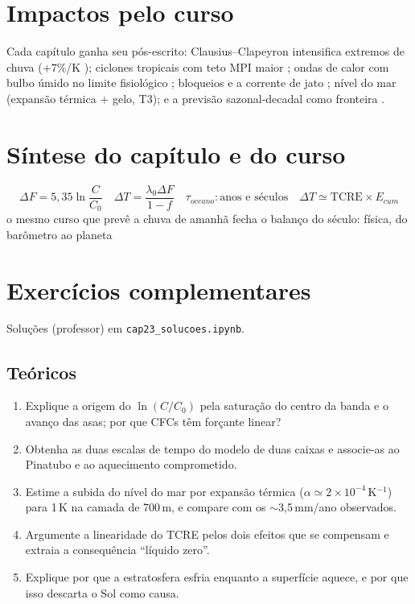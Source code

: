\documentclass[11pt]{article}
\begin{document}
\section{Impactos pelo curso}\label{sec:sintese}

Cada capítulo ganha seu pós-escrito: Clausius--Clapeyron intensifica
extremos de chuva ($+7\%$/K ); ciclones tropicais
com teto MPI maior ; ondas de calor com
bulbo úmido no limite fisiológico ; bloqueios e a
corrente de jato ; nível do mar (expansão térmica
$+$ gelo, T3); e a previsão sazonal-decadal como fronteira
.

\section{Síntese do capítulo e do curso}

\begin{noquadro}
\[ \Delta F = 5{,}35\ln\frac{C}{C_0} \quad
\Delta T = \frac{\lambda_0\Delta F}{1-f} \quad
\tau_{oceano}: \text{anos e séculos} \quad
\Delta T \simeq \mathrm{TCRE}\times E_{cum} \]
o mesmo curso que prevê a chuva de amanhã fecha o balanço do século:
física, do barômetro ao planeta
\end{noquadro}

\section{Exercícios complementares}\label{sec:exercicios}

Soluções (professor) em \texttt{cap23\_solucoes.ipynb}.

\subsection*{Teóricos}

\begin{enumerate}[label=\textbf{T\arabic*.},itemsep=4pt]
  \item Explique a origem do $\ln(C/C_0)$ pela saturação do centro da
        banda e o avanço das asas; por que CFCs têm forçante linear?
  \item Obtenha as duas escalas de tempo do modelo de duas caixas e
        associe-as ao Pinatubo e ao aquecimento comprometido.
  \item Estime a subida do nível do mar por expansão térmica
        ($\alpha \simeq 2\times10^{-4}$\,K$^{-1}$) para 1\,K na
        camada de 700\,m, e compare com os $\sim$3,5\,mm/ano
        observados.
  \item Argumente a linearidade do TCRE pelos dois efeitos que se
        compensam e extraia a consequência ``líquido zero''.
  \item Explique por que a estratosfera esfria enquanto a superfície
        aquece, e por que isso descarta o Sol como causa.
\end{enumerate}
\end{document}
